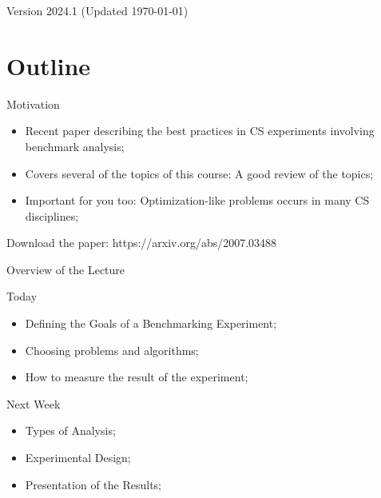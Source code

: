 \documentclass[aspectratio=169]{beamer}
\subtitle[Benchmarking Experiment Paper: Part I]{Paper Study -- "Benchmarking in Optimization: Best Practice and Open Issues"\\Part I}
\date{}
\begin{document}
\begin{frame}
  \maketitle

  \vfill

  \hfill \tiny{Version 2024.1 (Updated \today)}
\end{frame}

\section{Outline}

\begin{frame}[t]{Motivation}

  \begin{itemize}
    \item Recent paper describing the best practices in CS experiments involving benchmark analysis;
    \medskip
    
    \item Covers several of the topics of this course: A good review of the topics;
    \medskip

    \item Important for you too: Optimization-like problems occurs in many CS disciplines;
  \end{itemize}

  \vfill

  \begin{block}{}
    Download the paper: https://arxiv.org/abs/2007.03488
  \end{block}
\end{frame}

\begin{frame}{Overview of the Lecture}
  \begin{block}{Today}
    \begin{itemize}
      \item Defining the Goals of a Benchmarking Experiment;
      \item Choosing problems and algorithms;
      \item How to measure the result of the experiment;
    \end{itemize}
  \end{block}
  \begin{exampleblock}{Next Week}
    \begin{itemize}
      \item Types of Analysis;
      \item Experimental Design;
      \item Presentation of the Results;
    \end{itemize}
  \end{exampleblock}
\end{frame}
\end{document}
